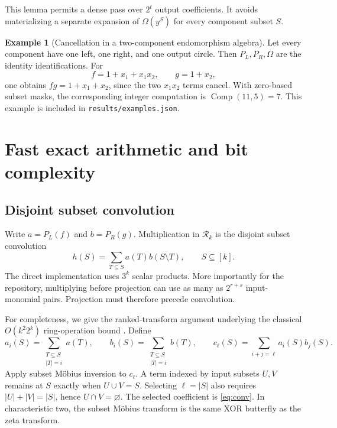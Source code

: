 \documentclass[11pt,letterpaper]{article}
\theoremstyle{definition}
\newtheorem{example}[theorem]{Example}
\theoremstyle{remark}
\newcommand{\R}{\mathcal R}
\newcommand{\Comp}{\operatorname{Comp}}
\begin{document}
This lemma permits a dense pass over $2^t$ output coefficients. It avoids
materializing a separate expansion of $\Omega(y^S)$ for every component
subset $S$.

\begin{example}[Cancellation in a two-component endomorphism algebra]
Let every component have one left, one right, and one output circle. Then
$P_L,P_R,\Omega$ are the identity identifications. For
\[
 f=1+x_1+x_1x_2,\qquad g=1+x_2,
\]
one obtains $fg=1+x_1+x_2$, since the two $x_1x_2$ terms cancel. With
zero-based subset masks, the corresponding integer computation is
$\Comp(11,5)=7$. This example is included in
\texttt{results/examples.json}.
\end{example}

\section{Fast exact arithmetic and bit complexity}
\label{sec:arithmetic}
\subsection{Disjoint subset convolution}
Write $a=P_L(f)$ and $b=P_R(g)$. Multiplication in $\R_k$ is the disjoint
subset convolution
\begin{equation}
 h(S)=\sum_{T\subseteq S} a(T)b(S\setminus T),\qquad S\subseteq[k].
 \label{eq:conv}
\end{equation}
The direct implementation uses $3^k$ scalar products. More importantly for
the repository, multiplying before projection can use as many as $2^{r+s}$
input-monomial pairs. Projection must therefore precede convolution.

For completeness, we give the ranked-transform argument underlying the
classical $O(k^2 2^k)$ ring-operation bound \cite{bhkk}. Define
\[
 a_i(S)=\sum_{\substack{T\subseteq S\\|T|=i}}a(T),\qquad
 b_i(S)=\sum_{\substack{T\subseteq S\\|T|=i}}b(T),
 \qquad c_\ell(S)=\sum_{i+j=\ell}a_i(S)b_j(S).
\]
Apply subset M\"obius inversion to $c_\ell$. A term indexed by input subsets
$U,V$ remains at $S$ exactly when $U\cup V=S$. Selecting $\ell=|S|$ also
requires $|U|+|V|=|S|$, hence $U\cap V=\varnothing$. The selected coefficient
is \eqref{eq:conv}. In characteristic two, the subset M\"obius transform is
the same XOR butterfly as the zeta transform.
\end{document}
